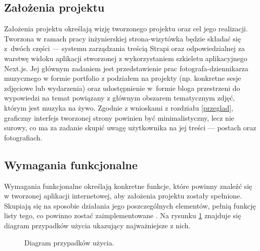 \documentclass[a4paper, 12pt, twoside]{article}
\numberwithin{figure}{section}
\begin{document}
\begin{sloppypar}

\subsection{Założenia projektu}

Założenia projektu określają wizję tworzonego projektu oraz cel jego realizacji. Tworzona w ramach pracy inżynierskiej strona-wizytówka będzie składać się z~dwóch części --- systemu zarządzania treścią Strapi oraz odpowiedzialnej za warstwę widoku aplikacji stworzonej z wykorzystaniem szkieletu aplikacyjnego Next.js. Jej głównym zadaniem jest przedstawienie prac fotografa-dziennikarza muzycznego w formie portfolio z podziałem na projekty (np. konkretne sesje zdjęciowe lub wydarzenia) oraz udostępnienie w~formie bloga przestrzeni do wypowiedzi na temat powiązany z głównym obszarem tematycznym zdjęć, którym jest muzyka na żywo. Zgodnie z wnioskami z rozdziału \ref{przeglad}, graficzny interfejs tworzonej strony powinien być minimalistyczny, lecz nie surowy, co ma za zadanie skupić uwagę użytkownika na jej treści --- postach oraz fotografiach. 


\subsection{Wymagania funkcjonalne}

Wymagania funkcjonalne określają konkretne funkcje, które powinny znaleźć się w tworzonej aplikacji internetowej, aby założenia projektu zostały spełnione. Skupiają się na sposobie działania jego poszczególnych elementów, pełnią funkcję listy tego, co powinno zostać zaimplementowane \cite{wymagania}. Na rysunku \ref{fig:przypadki.png} znajduje się diagram przypadków użycia ukazujący najważniejsze z nich.

\begin{figure}[H] 
    \centering
   \caption{Diagram przypadków użycia.}
   \label{fig:przypadki.png}
\end{figure}


\end{sloppypar}
\end{document}
